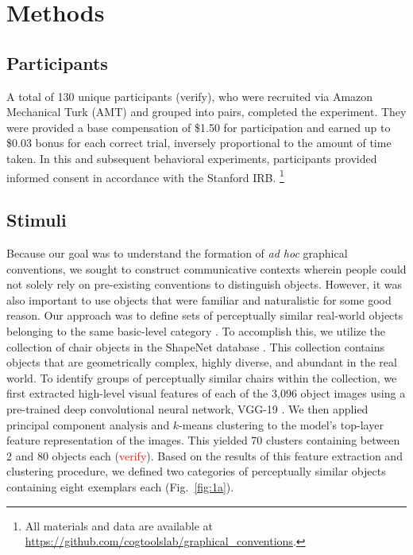 \documentclass[10pt,letterpaper]{article}
\newcommand{\red}[1]{\textcolor{Red}{#1}}
\begin{document}




\section{Methods}

\subsection{Participants}
A total of 130 unique participants (verify), who were recruited via Amazon Mechanical Turk (AMT) and grouped into pairs, completed the experiment.
They were provided a base compensation of \$1.50 for participation and earned up to \$0.03 bonus for each correct trial, inversely proportional to the amount of time taken. 
In this and subsequent behavioral experiments, participants provided informed consent in accordance with the Stanford IRB.
\footnote{All materials and data are available at \url{https://github.com/cogtoolslab/graphical_conventions}.}

\subsection{Stimuli}
Because our goal was to understand the formation of \textit{ad hoc} graphical conventions, we sought to construct communicative contexts wherein people could not solely rely on pre-existing conventions to distinguish objects.
However, it was also important to use objects that were familiar and naturalistic for some good reason.
Our approach was to define sets of perceptually similar real-world objects belonging to the same basic-level category \cite{MervisRosch81_CategorizationReview}.
To accomplish this, we utilize the collection of chair objects in the ShapeNet database \cite{chang2015shapenet}.
This collection contains objects that are geometrically complex, highly diverse, and abundant in the real world.
To identify groups of perceptually similar chairs within the collection, we first extracted high-level visual features of each of the 3,096 object images using a pre-trained deep convolutional neural network, VGG-19 \cite{simonyan2014very}. 
We then applied principal component analysis and $k$-means clustering to the model's top-layer feature representation of the images. 
This yielded 70 clusters containing between 2 and 80 objects each (\red{verify}).
Based on the results of this feature extraction and clustering procedure, we defined two categories of perceptually similar objects containing eight exemplars each (Fig.~\ref{fig:1a}). 
\end{document}
